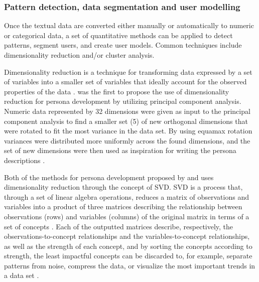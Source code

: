 



\subsubsection{Pattern detection, data segmentation and user modelling}

Once the textual data are converted either manually or automatically to numeric or categorical data, a set of quantitative methods can be applied to detect patterns, segment users, and create user models. Common techniques include dimensionality reduction and/or cluster analysis.

Dimensionality reduction is a technique for transforming data expressed by a set of variables into a smaller set of variables that ideally account for the observed properties of the data \citep{VanderMaaten2007}. \cite{Sinha2003} was the first to propose the use of dimensionality reduction for persona development by utilizing principal component analysis. Numeric data represented by 32 dimensions were given as input to the principal component analysis to find a smaller set (5) of new orthogonal dimensions that were rotated to fit the most variance in the data set. By using equamax rotation variances were distributed more uniformly across the found dimensions, and the set of new dimensions were then used as inspiration for writing the persona descriptions \citep{Sinha2003}.

Both of the methods for persona development proposed by \cite{Miaskiewicz2008} and \cite{Laporte2012} uses dimensionality reduction through the concept of SVD. SVD is a process that, through a set of linear algebra operations, reduces a matrix of observations and variables into a product of three matrices describing the relationship between observations (rows) and variables (columns) of the original matrix in terms of a set of concepts \citep{Leskovec2014}. Each of the outputted matrices describe, respectively, the observations-to-concept relationships and the variables-to-concept relationships, as well as the strength of each concept, and by sorting the concepts according to strength, the least impactful concepts can be discarded to, for example, separate patterns from noise, compress the data, or visualize the most important trends in a data set \citep{Leskovec2014}.

